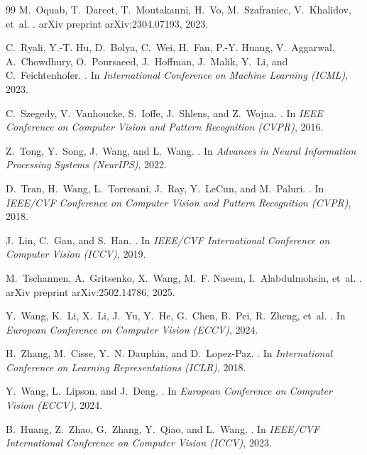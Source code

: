 \documentclass[10pt,twocolumn,letterpaper]{article}
\begin{document}
{\begin{thebibliography}{99}
M.~Oquab, T.~Darcet, T.~Moutakanni, H.~Vo, M.~Szafraniec, V.~Khalidov, et~al.
.
\newblock arXiv preprint arXiv:2304.07193, 2023.

C.~Ryali, Y.-T. Hu, D.~Bolya, C.~Wei, H.~Fan, P.-Y. Huang, V.~Aggarwal, A.~Chowdhury, O.~Poursaeed, J.~Hoffman, J.~Malik, Y.~Li, and C.~Feichtenhofer.
.
\newblock In \emph{International Conference on Machine Learning (ICML)}, 2023.

C.~Szegedy, V.~Vanhoucke, S.~Ioffe, J.~Shlens, and Z.~Wojna.
.
\newblock In \emph{IEEE Conference on Computer Vision and Pattern Recognition (CVPR)}, 2016.

Z.~Tong, Y.~Song, J.~Wang, and L.~Wang.
.
\newblock In \emph{Advances in Neural Information Processing Systems (NeurIPS)}, 2022.

D.~Tran, H.~Wang, L.~Torresani, J.~Ray, Y.~LeCun, and M.~Paluri.
.
\newblock In \emph{IEEE/CVF Conference on Computer Vision and Pattern Recognition (CVPR)}, 2018.

J.~Lin, C.~Gan, and S.~Han.
.
\newblock In \emph{IEEE/CVF International Conference on Computer Vision (ICCV)}, 2019.

M.~Tschannen, A.~Gritsenko, X.~Wang, M.~F. Naeem, I.~Alabdulmohsin, et~al.
.
\newblock arXiv preprint arXiv:2502.14786, 2025.

Y.~Wang, K.~Li, X.~Li, J.~Yu, Y.~He, G.~Chen, B.~Pei, R.~Zheng, et~al.
.
\newblock In \emph{European Conference on Computer Vision (ECCV)}, 2024.

H.~Zhang, M.~Cisse, Y.~N. Dauphin, and D.~Lopez-Paz.
.
\newblock In \emph{International Conference on Learning Representations (ICLR)}, 2018.

Y.~Wang, L.~Lipson, and J.~Deng.
.
\newblock In \emph{European Conference on Computer Vision (ECCV)}, 2024.

B.~Huang, Z.~Zhao, G.~Zhang, Y.~Qiao, and L.~Wang.
.
\newblock In \emph{IEEE/CVF International Conference on Computer Vision (ICCV)}, 2023.

\end{thebibliography}
}
\end{document}
